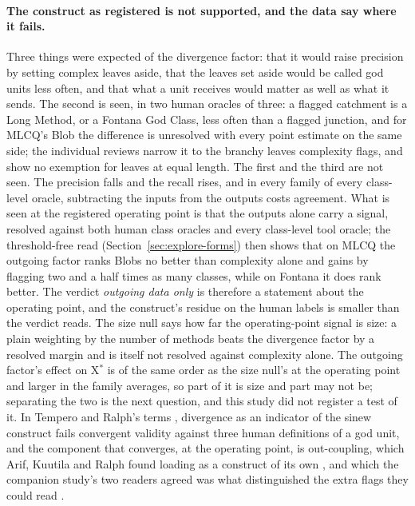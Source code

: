 \documentclass[11pt,a4paper]{article}
\newcommand{\Xs}{X$^*$}
\begin{document}
\paragraph{The construct as registered is not supported, and the data say
where it fails.} Three things were expected of the divergence factor: that
it would raise precision by setting complex leaves aside, that the leaves
set aside would be called god units less often, and that what a unit
receives would matter as well as what it sends. The second is seen, in two human oracles of three: a flagged catchment is
a Long Method, or a Fontana God Class, less often than a flagged junction,
and for MLCQ's Blob the difference is unresolved with every point estimate
on the same side; the individual reviews narrow it to the branchy leaves
complexity flags, and show no exemption for leaves at equal length. The
first and the third are not seen. The precision falls and the recall rises,
and in every family of every class-level oracle, subtracting the inputs from
the outputs costs agreement. What is seen at the registered operating point is that the outputs alone
carry a signal, resolved against both human class oracles and every
class-level tool oracle; the threshold-free read (Section~\ref{sec:explore-forms})
then shows that on MLCQ the outgoing factor ranks Blobs no better than
complexity alone and gains by flagging two and a half times as many
classes, while on Fontana it does rank better. The verdict \emph{outgoing
data only} is therefore a statement about the operating point, and the
construct's residue on the human labels is smaller than the verdict reads.
The size null says how far the operating-point signal is size: a plain weighting by the number of methods beats the
divergence factor by a resolved margin and is itself not resolved against
complexity alone. The outgoing factor's effect on \Xs{} is of the same
order as the size null's at the operating point and larger in the family
averages, so part of it is size and part may not be; separating the two is
the next question, and this study did not register a test of it. In Tempero
and Ralph's terms \cite{tempero2026metrics}, divergence as an indicator of
the sinew construct fails convergent validity against three human
definitions of a god unit, and the component that converges, at the operating point, is out-coupling,
which Arif, Kuutila and Ralph found loading as a construct of its own
\cite{arif2026}, and which the companion study's two readers agreed was what
distinguished the extra flags they could read \cite{paperone}.
\end{document}
